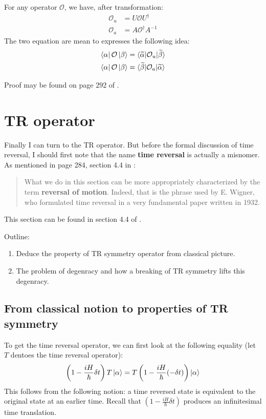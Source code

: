 \documentclass{article}
\numberwithin{equation}{subsection} %
\theoremstyle{definition}
\begin{document}
For any operator $\mathcal{O}$, we have, after transformation:
\begin{align}
    \mathcal{O}_u &= U\mathcal{O}U^\dagger \\
    \mathcal{O}_a &= A \mathcal{O}^\dagger A^{-1}
\end{align}
The two equation are mean to expresses the following idea:
\begin{align}
    \bra{\alpha}\mathcal{O}\ket{\beta} &=
    \braket{\widetilde{\alpha}|\mathcal{O}_u |\widetilde{\beta}} \\
    \bra{\alpha}\mathcal{O}\ket{\beta} &=
    \braket{\widetilde{\beta}|\mathcal{O}_a |\widetilde{\alpha}}
\end{align}

Proof may be found on page 292 of \cite{sakurai}.
\section{TR operator}

Finally I can turn to the TR operator. But before the formal discussion of
time reversal, I should first note that the name \textbf{time reversal} is
actually a misnomer. As mentioned in page 284, section 4.4 in 
\cite{sakurai}:
\begin{quote}
    What we do in this section can be more appropriately characterized by
    the term \textbf{reversal of motion}. Indeed, that is the phrase used
    by E.  Wigner, who formulated time reversal in a very fundamental
    paper written in 1932.
\end{quote}
This section can be found in section 4.4 of \cite{sakurai}.

Outline:
\begin{enumerate}
    \item Deduce the property of TR symmetry operator from classical
        picture.
    \item The problem of degenracy and how a breaking of TR symmetry lifts
        this degenracy.
\end{enumerate}

    \subsection{From classical notion to properties of TR symmetry}
    \label{sec:From-classical-notion-to-property-of-TR-symmetry}
    To get the time reversal operator, we can first look at the following
    equality (let $T$ dentoes the time reversal operator):
    \begin{align}
        \left(1-\frac{iH}{\hbar}\delta t\right) T \ket{\alpha}
        = T\left(1-\frac{iH}{\hbar}(-\delta t)\right)\ket{\alpha}
        \label{eq:TRoper.fromClas2Quam.phyPic}
    \end{align}
    This follows from the following notion: a time reversed state is
    equivalent to the original state at an earlier time. Recall that
    $\left(1-\frac{iH}{\hbar}\delta t\right)$ produces an infinitesimal
    time translation.
\end{document}
